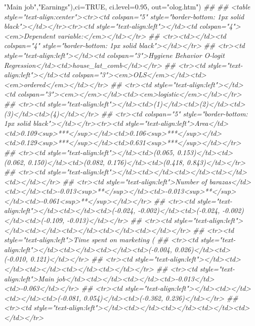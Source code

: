 \documentclass[
]{article}
\newenvironment{Shaded}{\begin{snugshade}}{\end{snugshade}}
\newcommand{\CommentTok}[1]{\textcolor[rgb]{0.56,0.35,0.01}{\textit{#1}}}
\newcommand{\DataTypeTok}[1]{\textcolor[rgb]{0.13,0.29,0.53}{#1}}
\newcommand{\FloatTok}[1]{\textcolor[rgb]{0.00,0.00,0.81}{#1}}
\newcommand{\NormalTok}[1]{#1}
\newcommand{\OtherTok}[1]{\textcolor[rgb]{0.56,0.35,0.01}{#1}}
\newcommand{\StringTok}[1]{\textcolor[rgb]{0.31,0.60,0.02}{#1}}
\begin{document}
\begin{Shaded}
\begin{Highlighting}[]
{{{{{{{{{                             \StringTok{"Main job"}\NormalTok{,}\StringTok{"Earnings"}\NormalTok{),}\DataTypeTok{ci=}\OtherTok{TRUE}\NormalTok{, }\DataTypeTok{ci.level=}\FloatTok{0.95}\NormalTok{, }\DataTypeTok{out=}\StringTok{"olog.htm"}\NormalTok{)}
\CommentTok{## }
\CommentTok{## <table style="text-align:center"><tr><td colspan="5" style="border-bottom: 1px solid black"></td></tr><tr><td style="text-align:left"></td><td colspan="4"><em>Dependent variable:</em></td></tr>}
\CommentTok{## <tr><td></td><td colspan="4" style="border-bottom: 1px solid black"></td></tr>}
\CommentTok{## <tr><td style="text-align:left"></td><td colspan="3">Hygiene Behavior O-logit Regression</td><td>house_lat_comb</td></tr>}
\CommentTok{## <tr><td style="text-align:left"></td><td colspan="3"><em>OLS</em></td><td><em>ordered</em></td></tr>}
\CommentTok{## <tr><td style="text-align:left"></td><td colspan="3"><em></em></td><td><em>logistic</em></td></tr>}
\CommentTok{## <tr><td style="text-align:left"></td><td>(1)</td><td>(2)</td><td>(3)</td><td>(4)</td></tr>}
\CommentTok{## <tr><td colspan="5" style="border-bottom: 1px solid black"></td></tr><tr><td style="text-align:left">Area</td><td>0.109<sup>***</sup></td><td>0.106<sup>***</sup></td><td>0.129<sup>***</sup></td><td>0.631<sup>***</sup></td></tr>}
\CommentTok{## <tr><td style="text-align:left"></td><td>(0.065, 0.153)</td><td>(0.062, 0.150)</td><td>(0.082, 0.176)</td><td>(0.418, 0.843)</td></tr>}
\CommentTok{## <tr><td style="text-align:left"></td><td></td><td></td><td></td><td></td></tr>}
\CommentTok{## <tr><td style="text-align:left">Number of barazas</td><td></td><td>-0.013<sup>**</sup></td><td>-0.013<sup>**</sup></td><td>-0.061<sup>**</sup></td></tr>}
\CommentTok{## <tr><td style="text-align:left"></td><td></td><td>(-0.024, -0.002)</td><td>(-0.024, -0.002)</td><td>(-0.109, -0.013)</td></tr>}
\CommentTok{## <tr><td style="text-align:left"></td><td></td><td></td><td></td><td></td></tr>}
\CommentTok{## <tr><td style="text-align:left">Time spent on marketing (%)</td><td></td><td></td><td>0.011</td><td>0.055<sup>*</sup></td></tr>}
\CommentTok{## <tr><td style="text-align:left"></td><td></td><td></td><td>(-0.004, 0.026)</td><td>(-0.010, 0.121)</td></tr>}
\CommentTok{## <tr><td style="text-align:left"></td><td></td><td></td><td></td><td></td></tr>}
\CommentTok{## <tr><td style="text-align:left">Main job</td><td></td><td></td><td>-0.013</td><td>-0.063</td></tr>}
\CommentTok{## <tr><td style="text-align:left"></td><td></td><td></td><td>(-0.081, 0.054)</td><td>(-0.362, 0.236)</td></tr>}
\CommentTok{## <tr><td style="text-align:left"></td><td></td><td></td><td></td><td></td></tr>}
}}}}}}}}}}
\end{Highlighting}
\end{Shaded}
\end{document}
